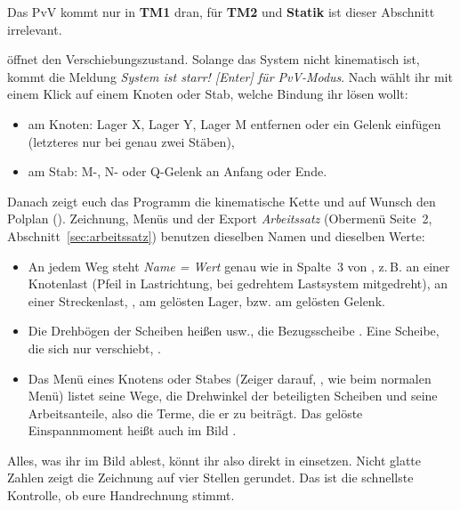 Das PvV kommt nur in \textbf{TM1} dran,
für \textbf{TM2} und \textbf{Statik} ist dieser Abschnitt irrelevant.

 öffnet den Verschiebungszustand. Solange das System nicht kinematisch ist, kommt die
Meldung \emph{System ist starr! [Enter] für PvV-Modus}. Nach  wählt ihr mit
einem Klick auf einem Knoten oder Stab, welche Bindung ihr lösen wollt:

\begin{itemize}
  \item am Knoten: Lager X, Lager Y, Lager M entfernen oder ein Gelenk einfügen (letzteres nur
        bei genau zwei Stäben),
  \item am Stab: M-, N- oder Q-Gelenk an Anfang oder Ende.
\end{itemize}

Danach zeigt euch das Programm die kinematische Kette und auf Wunsch den Polplan ().
Zeichnung, Menüs und der Export \emph{Arbeitssatz} (Obermenü Seite~2, Abschnitt~\ref{sec:arbeitssatz})
benutzen dieselben Namen und dieselben Werte:

\begin{itemize}
  \item An jedem Weg steht \emph{Name = Wert} genau wie in Spalte~3 von , z.\,B.
         an einer Knotenlast (Pfeil in Lastrichtung, bei
        gedrehtem Lastsystem mitgedreht),  an einer Streckenlast,
        ,  am gelösten Lager,  bzw.
         am gelösten Gelenk.
  \item Die Drehbögen der Scheiben heißen  usw., die
        Bezugsscheibe . Eine Scheibe, die sich nur verschiebt,
        .
  \item Das Menü eines Knotens oder Stabes (Zeiger darauf, , wie beim normalen
        Menü) listet seine Wege, die Drehwinkel der
        beteiligten Scheiben und seine Arbeitsanteile, also die Terme, die er zu 
        beiträgt. Das gelöste Einspannmoment heißt auch im Bild .
\end{itemize}

Alles, was ihr im Bild ablest, könnt ihr also direkt in  einsetzen. Nicht glatte
Zahlen zeigt die Zeichnung auf vier Stellen gerundet. Das ist die schnellste Kontrolle, ob eure
Handrechnung stimmt.

